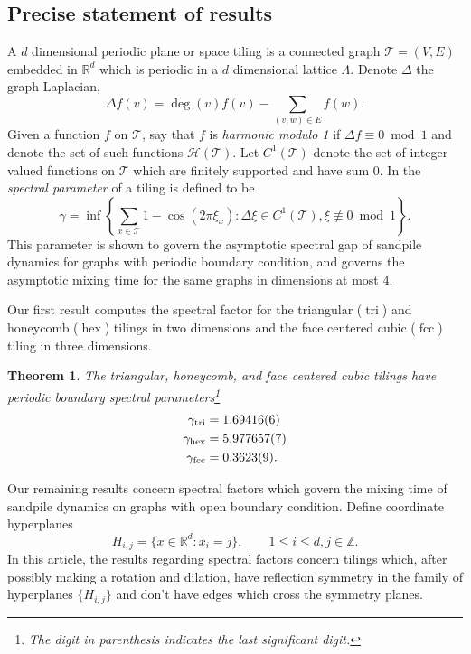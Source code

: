 \documentclass[a4paper, 12pt, notitlepage]{amsart}
\newcommand{\tri}{\operatorname{tri}}
\newcommand{\hex}{\operatorname{hex}}
\newcommand{\dice}{\operatorname{dice}}
\newcommand{\fcc}{\operatorname{fcc}}
\newcommand{\bR}{\mathbb{R}}
\newcommand{\zed}{\mathbb{Z}}
\newcommand{\sH}{\mathscr{H}}
\newcommand{\sT}{\mathscr{T}}
\newtheorem{theorem}{Theorem}
\theoremstyle{remark}
\begin{document}
 
\subsection{Precise statement of results}
A $d$ dimensional periodic plane or space tiling is a connected graph $\sT =(V,E)$ embedded in $\bR^d$ which is periodic in a $d$ dimensional lattice $\Lambda$. Denote $\Delta$  the graph Laplacian,
\[
 \Delta f(v) = \deg(v) f(v) - \sum_{(v,w) \in E}f(w).
\]
Given a function $f$ on $\sT$, say that $f$ is \emph{harmonic modulo 1} if $\Delta f \equiv 0 \bmod 1$ and denote the set of such functions $\sH(\sT)$. Let $C^1(\sT)$ denote the set of integer valued functions on $\sT$ which are finitely supported and have sum 0.
In \cite{HS19} the \emph{spectral parameter} of a tiling is defined to be
\begin{equation}
 \gamma = \inf \left\{ \sum_{x \in \sT} 1 - \cos(2\pi \xi_x):\Delta \xi \in C^1(\sT), \xi \not \equiv 0 \bmod 1\right\}.
\end{equation}
This parameter is shown to govern the asymptotic spectral gap of sandpile dynamics for graphs with periodic boundary condition, and governs the asymptotic mixing time for the same graphs in dimensions at most 4. 

Our first result computes the spectral factor for the triangular ($\tri$) and honeycomb ($\hex$) tilings in two dimensions and the face centered cubic ($\fcc$) tiling in three dimensions.  



\begin{theorem}\label{spectral_gap_calc_theorem}
  The triangular, honeycomb, %
 and face centered cubic tilings have periodic boundary spectral parameters\footnote{The digit in parenthesis indicates the last significant digit.}
 \begin{align*}
 \gamma_{\tri} &= 1.69416(6)\\
 \notag \gamma_{\hex} &= 5.977657(7)\\
 \notag \gamma_{\fcc} &= 0.3623(9).
 \end{align*}
\end{theorem}

Our remaining results concern spectral factors which govern the mixing time of sandpile dynamics on graphs with open boundary condition.  Define coordinate hyperplanes
\[
 H_{i,j} = \{x \in \bR^d: x_i = j\}, \qquad 1 \leq i \leq d, j \in \zed.
\]
In this article, the results regarding spectral factors concern tilings which, after possibly making a rotation and dilation, have reflection symmetry in the family of hyperplanes $\{H_{i,j}\}$ and don't have edges which cross the symmetry planes.  
\end{document}
